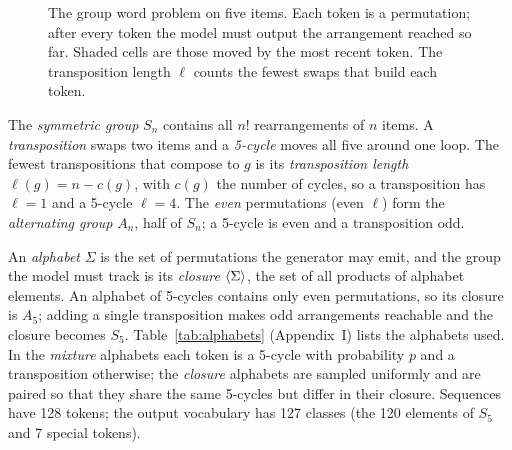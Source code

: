 \begin{figure}[ht]
\centering
{}
\caption[The group word problem on five items]{The group word problem on five items. Each token is a permutation; after every token the model must output the arrangement reached so far. Shaded cells are those moved by the most recent token. The transposition length $\ell$ counts the fewest swaps that build each token.}
\label{fig:task}
\end{figure}

The \emph{symmetric group} $S_n$ contains all $n!$ rearrangements of $n$ items. A \emph{transposition} swaps two items and a \emph{5-cycle} moves all five around one loop. The fewest transpositions that compose to $g$ is its \emph{transposition length} $\ell(g) = n - c(g)$, with $c(g)$ the number of cycles, so a transposition has $\ell=1$ and a 5-cycle $\ell=4$. The \emph{even} permutations (even $\ell$) form the \emph{alternating group} $A_n$, half of $S_n$; a 5-cycle is even and a transposition odd.

An \emph{alphabet} $\Sigma$ is the set of permutations the generator may emit, and the group the model must track is its \emph{closure} $\langle \Sigma \rangle$, the set of all products of alphabet elements. An alphabet of 5-cycles contains only even permutations, so its closure is $A_5$; adding a single transposition makes odd arrangements reachable and the closure becomes $S_5$. Table~\ref{tab:alphabets} (Appendix~I) lists the alphabets used. In the \emph{mixture} alphabets each token is a 5-cycle with probability $p$ and a transposition otherwise; the \emph{closure} alphabets are sampled uniformly and are paired so that they share the same 5-cycles but differ in their closure. Sequences have 128 tokens; the output vocabulary has 127 classes (the 120 elements of $S_5$ and 7 special tokens).


